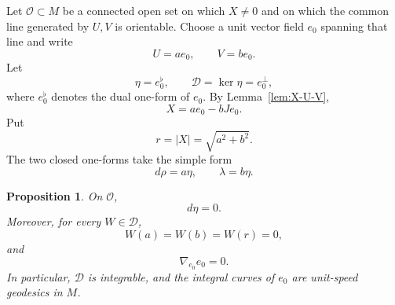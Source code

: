 \documentclass[11pt,a4paper]{article}
\numberwithin{equation}{section}
\newtheorem{proposition}[theorem]{Proposition}
\newcommand{\Dcal}{\mathcal D}
\begin{document}
Let $\mathcal O\subset M$ be a connected open set on which $X\ne0$ and on which the common line generated by $U,V$ is orientable.  Choose a unit vector field $e_0$ spanning that line and write
\begin{equation*}
        U=a e_0,
        \qquad
        V=b e_0.
\end{equation*}
Let
\begin{equation*}
        \eta=e_0^\flat,
        \qquad
        \Dcal=\ker\eta=e_0^\perp,
\end{equation*}
where $e_0^\flat$ denotes the dual one-form of $e_0$.
By Lemma~\ref{lem:X-U-V},
\begin{equation}\label{eq:X-a-b}
        X=a e_0-bJe_0.
\end{equation}
Put
\begin{equation}\label{eq:r-a-b}
        r=|X|=\sqrt{a^2+b^2}.
\end{equation}
The two closed one-forms take the simple form
\begin{equation}\label{eq:closed-forms-a-b}
        d\rho=a\eta,
        \qquad
        \lambda=b\eta.
\end{equation}

\begin{proposition}\label{prop:eta-closed}
On $\mathcal O$,
\begin{equation}\label{eq:eta-closed}
        d\eta=0.
\end{equation}
Moreover, for every $W\in\Dcal$,
\begin{equation}
        W(a)=W(b)=W(r)=0,
\end{equation}
and
\begin{equation}
        \nabla_{e_0}e_0=0.
\end{equation}
In particular, $\Dcal$ is integrable, and the integral curves of $e_0$ are unit-speed geodesics in $M$.
\end{proposition}
\end{document}
